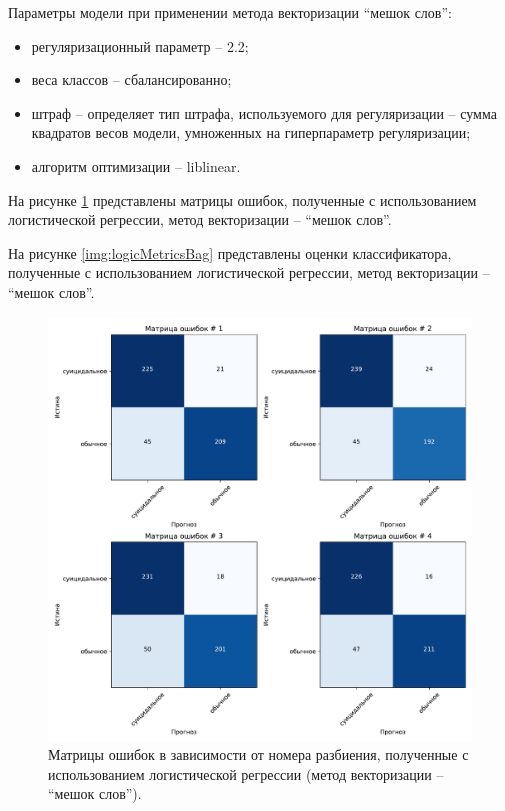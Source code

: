 Параметры модели при применении метода векторизации ``мешок слов'':
\begin{itemize}
	\item регуляризационный параметр -- 2.2;
	\item веса классов -- сбалансированно;
	\item штраф -- определяет тип штрафа, используемого для регуляризации -- сумма квадратов весов модели, умноженных на гиперпараметр регуляризации;
	\item алгоритм оптимизации -- liblinear.
\end{itemize}

На рисунке \ref{img:logicMatrBag} представлены матрицы ошибок, полученные с использованием логистической регрессии, метод векторизации -- ``мешок слов''.

На рисунке \ref{img:logicMetricsBag} представлены оценки классификатора, полученные с использованием логистической регрессии, метод векторизации -- ``мешок слов''.

\begin{figure}[H]
	\centering
	\includegraphics[width=\textwidth]{inc/plots/logicMatrBag.pdf}
	\caption{ Матрицы ошибок в зависимости от номера разбиения, полученные с использованием логистической регрессии (метод векторизации -- ``мешок слов''). }
	\label{img:logicMatrBag}
\end{figure}

